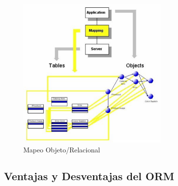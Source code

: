 \documentclass[preprint,12pt]{elsarticle}
\begin{document}



\begin{figure}[htb]
	\begin{center}
		\includegraphics[width=7.5cm]{./IMAGENES/ORM} 
		\caption{Mapeo Objeto/Relacional}
	\end{center}
\end{figure}


\subsection {\textbf{Ventajas y Desventajas del ORM\\}}
\end{document}
